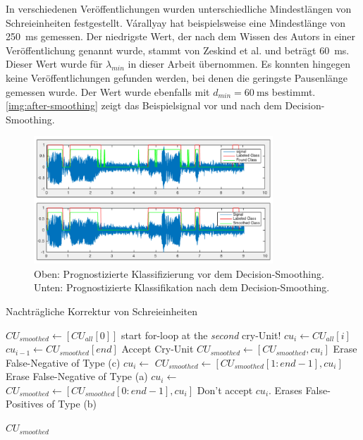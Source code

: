 In verschiedenen Veröffentlichungen wurden unterschiedliche Mindestlängen von Schreieinheiten festgestellt. Várallyay \cite[S. 8]{cry_thesis} hat beispielsweise eine Mindestlänge von \SI{250}{\milli\second} gemessen. Der niedrigste Wert, der nach dem Wissen des Autors in einer Veröffentlichung genannt wurde, stammt von Zeskind et al. \cite[S. 325]{rythmic} und beträgt  \SI{60}{\milli\second}. Dieser Wert wurde für $\lambda_{min}$ in dieser Arbeit übernommen. Es konnten hingegen keine Veröffentlichungen gefunden werden, bei denen die geringste Pausenlänge gemessen wurde. Der Wert wurde ebenfalls mit $d_{min} = \SI{60}{\milli\second}$ bestimmt. \autoref{img:after-smoothing} zeigt das Beispielsignal vor und nach dem Decision-Smoothing. 

\begin{figure}[h]
	\centering
	\includegraphics[width=0.8\textwidth]{bilder/smoothing04.png}
	\caption[Klassifizierung nach dem Decision-Smoothing]{Oben: Prognostizierte Klassifizierung vor dem Decision-Smoothing. Unten: Prognostizierte Klassifikation nach dem Decision-Smoothing.}
	\label{img:after-smoothing}
\end{figure}

\begin{algorithm}[h]
	\caption{Nachträgliche Korrektur von Schreieinheiten}
	\label{alg:decisionSmoothing}
	\begin{algorithmic}[1]
		\State $CU_{smoothed} \gets[CU_{all}[0]] $
		\State \Comment start for-loop at the \emph{second} cry-Unit!
			\State $cu_i \gets CU_{all}[i]$
			\State $cu_{i-1} \gets CU_{smoothed}[end]$
			\State \Comment Accept Cry-Unit
					\State $CU_{smoothed} \gets [CU_{smoothed}, cu_i] $
			\Else
					\State \Comment Erase False-Negative of Type (c)
					\State $cu_i \gets $ 
					\State $CU_{smoothed} \gets [CU_{smoothed}[1:end-1], cu_i] $
			\EndIf
			\Else
			\State \Comment Erase False-Negative of Type (a)
			\State $cu_i \gets $ 
			\State $CU_{smoothed} \gets [CU_{smoothed}[0:end-1], cu_i] $
			\Else
			\State \Comment Don't accept $cu_i$. Erases False-Positives of Type (b)
			\EndIf
			\EndIf
		\EndFor
		
		\Return $CU_{smoothed}$
		\EndFunction
		
	\end{algorithmic}
\end{algorithm}



